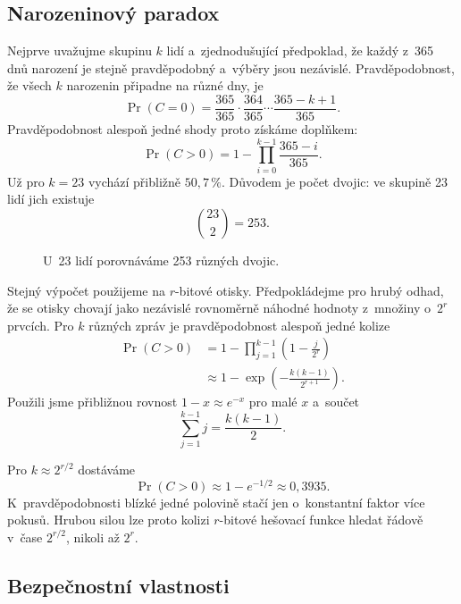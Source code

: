 \subsection{Narozeninový paradox}

Nejprve uvažujme skupinu $k$ lidí a~zjednodušující předpoklad, že každý z~365 dnů narození je stejně pravděpodobný a~výběry jsou nezávislé. Pravděpodobnost, že všech $k$ narozenin připadne na různé dny, je
\[
    \Pr(C=0)
    =
    \frac{365}{365}
    \cdot
    \frac{364}{365}
    \cdots
    \frac{365-k+1}{365}.
\]
Pravděpodobnost alespoň jedné shody proto získáme doplňkem:
\[
    \Pr(C>0)
    =
    1-\prod_{i=0}^{k-1}\frac{365-i}{365}.
\]
Už pro $k=23$ vychází přibližně $50{,}7\,\%$. Důvodem je počet dvojic: ve skupině 23 lidí jich existuje
\[
    \binom{23}{2}=253.
\]

\begin{figure}[ht]
    \centering
    
    \caption{U~23 lidí porovnáváme 253 různých dvojic.}
    \label{fig:krypto-narozeniny}
\end{figure}

Stejný výpočet použijeme na $r$-bitové otisky. Předpokládejme pro hrubý odhad, že se otisky chovají jako nezávislé rovnoměrně náhodné hodnoty z~množiny o~$2^r$ prvcích. Pro $k$ různých zpráv je pravděpodobnost alespoň jedné kolize
\begin{align*}
    \Pr(C>0)
    &=
    1-\prod_{j=1}^{k-1}\left(1-\frac{j}{2^r}\right)\\
    &\approx
    1-\exp\left(-\frac{k(k-1)}{2^{r+1}}\right).
\end{align*}
Použili jsme přibližnou rovnost $1-x\approx e^{-x}$ pro malé $x$ a~součet
\[
    \sum_{j=1}^{k-1}j=\frac{k(k-1)}{2}.
\]

Pro $k\approx 2^{r/2}$ dostáváme
\[
    \Pr(C>0)
    \approx
    1-e^{-1/2}
    \approx
    0{,}3935.
\]
K~pravděpodobnosti blízké jedné polovině stačí jen o~konstantní faktor více pokusů. Hrubou silou lze proto kolizi $r$-bitové hešovací funkce hledat řádově v~čase $2^{r/2}$, nikoli až $2^r$.


\subsection{Bezpečnostní vlastnosti}

